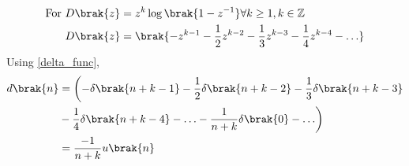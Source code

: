 \begin{align}
	\notag \text{For } D\brak{z}&= z^{k}\log\brak{1-z^{-1}} \forall k \geq 1, k\in \mathbb{Z}\\
	D\brak{z}&= \brak{-z^{k-1} - \frac{1}{2}z^{k-2} - \frac{1}{3}z^{k-3} - \frac{1}{4}z^{k-4} - \ldots}
\end{align}
Using \eqref{delta_func},
\begin{align}
	d\brak{n} &= \biggl(-\delta\brak{n+k-1}  -\frac{1}{2}\delta\brak{n+k-2}  -\frac{1}{3}\delta\brak{n+k-3} \notag \\ &-\frac{1}{4}\delta\brak{n+k-4} - \ldots - \frac{1}{n+k}\delta\brak{0}-\ldots\biggr)\\
	&= \frac{-1}{n+k} u\brak{n} \label{11027_eq_log}
\end{align}

